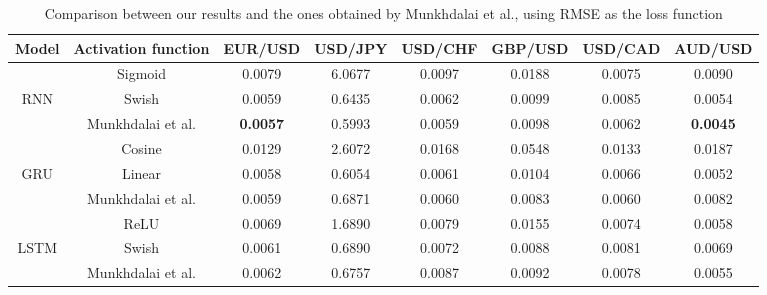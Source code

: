 \documentclass{ieeeaccess}
\begin{document}
\begin{table}[t]
  \caption{Comparison between our results and the ones obtained by Munkhdalai et al., using RMSE as the loss function}
 \scriptsize
  \centering
  \begin{tabular*}{0.9\textwidth}{c @{\extracolsep{\fill}} ccccccc}
    \hline
    \textbf{Model} & \textbf{Activation function} & \textbf{EUR/USD} & \textbf{USD/JPY} & \textbf{USD/CHF} & \textbf{GBP/USD} & \textbf{USD/CAD} & \textbf{AUD/USD} \\
    \hline

           & Sigmoid & 0.0079 & 6.0677 & 0.0097 & 0.0188 & 0.0075 & 0.0090 \\
    RNN    & Swish & 0.0059 & 0.6435 & 0.0062 & 0.0099 & 0.0085 & 0.0054 \\
           & Munkhdalai et al. & \textbf{0.0057} & 0.5993 & 0.0059 & 0.0098 & 0.0062 & \textbf{0.0045} \\

    \hline

           & Cosine & 0.0129 & 2.6072 & 0.0168 & 0.0548 & 0.0133 & 0.0187 \\
    GRU    & Linear & 0.0058 & 0.6054 & 0.0061 & 0.0104 & 0.0066 & 0.0052 \\
           & Munkhdalai et al. & 0.0059 & 0.6871 & 0.0060 & 0.0083 & 0.0060 & 0.0082 \\

    \hline

           & ReLU & 0.0069 & 1.6890 & 0.0079 & 0.0155 & 0.0074 & 0.0058 \\
    LSTM   & Swish & 0.0061 & 0.6890 & 0.0072 & 0.0088 & 0.0081 & 0.0069 \\
           & Munkhdalai et al. & 0.0062 & 0.6757 & 0.0087 & 0.0092 & 0.0078 & 0.0055 \\
    
    \hline


\end{tabular*}
\end{table}
\end{document}
